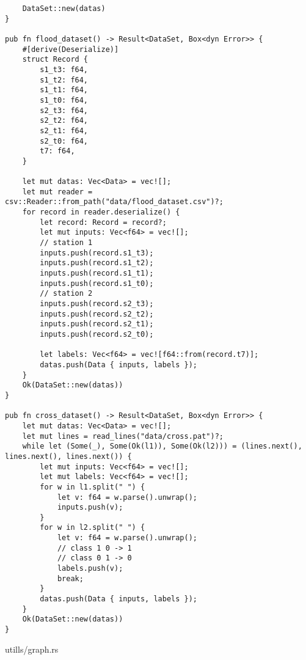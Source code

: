 \begin{verbatim}
    DataSet::new(datas)
}

pub fn flood_dataset() -> Result<DataSet, Box<dyn Error>> {
    #[derive(Deserialize)]
    struct Record {
        s1_t3: f64,
        s1_t2: f64,
        s1_t1: f64,
        s1_t0: f64,
        s2_t3: f64,
        s2_t2: f64,
        s2_t1: f64,
        s2_t0: f64,
        t7: f64,
    }

    let mut datas: Vec<Data> = vec![];
    let mut reader = csv::Reader::from_path("data/flood_dataset.csv")?;
    for record in reader.deserialize() {
        let record: Record = record?;
        let mut inputs: Vec<f64> = vec![];
        // station 1
        inputs.push(record.s1_t3);
        inputs.push(record.s1_t2);
        inputs.push(record.s1_t1);
        inputs.push(record.s1_t0);
        // station 2
        inputs.push(record.s2_t3);
        inputs.push(record.s2_t2);
        inputs.push(record.s2_t1);
        inputs.push(record.s2_t0);

        let labels: Vec<f64> = vec![f64::from(record.t7)];
        datas.push(Data { inputs, labels });
    }
    Ok(DataSet::new(datas))
}

pub fn cross_dataset() -> Result<DataSet, Box<dyn Error>> {
    let mut datas: Vec<Data> = vec![];
    let mut lines = read_lines("data/cross.pat")?;
    while let (Some(_), Some(Ok(l1)), Some(Ok(l2))) = (lines.next(), lines.next(), lines.next()) {
        let mut inputs: Vec<f64> = vec![];
        let mut labels: Vec<f64> = vec![];
        for w in l1.split(" ") {
            let v: f64 = w.parse().unwrap();
            inputs.push(v);
        }
        for w in l2.split(" ") {
            let v: f64 = w.parse().unwrap();
            // class 1 0 -> 1
            // class 0 1 -> 0
            labels.push(v);
            break;
        }
        datas.push(Data { inputs, labels });
    }
    Ok(DataSet::new(datas))
}
\end{verbatim}
\noindent utills/graph.rs
